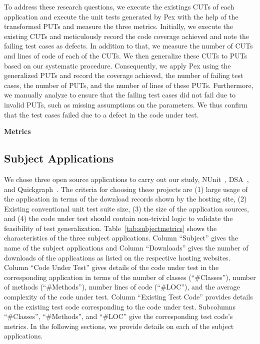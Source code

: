 To address these research questions, we execute the existings CUTs of each application and execute the unit tests generated by Pex with the help of the transformed PUTs and measure the three metrics. Initially, we execute the existing CUTs and meticulously record the code coverage achieved and note the failing test cases as defects. In addition to that, we measure the number of CUTs and lines of code of each of the CUTs. We then generalize these CUTs to PUTs based on our systematic procedure. Consequently, we apply Pex using the generalized PUTs and record the coverage achieved, the number of failing test cases, the number of PUTs, and the number of lines of these PUTs. Furthermore, we manually analyze to ensure that the failing test cases did not fail due to invalid PUTs, such as missing assumptions on the parameters. We thus confirm that the test cases failed due to a defect in the code under test. 

\noindent\textbf{Metrics}

\subsection{Subject Applications}

We chose three open source applications to carry out our study, NUnit~\cite{nunit}, DSA~\cite{dsa}, and Quickgraph~\cite{quickgraph}. The criteria for choosing these projects are (1) large usage of the application in terms of the download records shown by the hosting site, (2) Existing conventional unit test suite size, (3) the size of the application sources, and (4) the code under test should contain non-trivial logic to validate the feasibility of test generalization. Table~\ref{tab:subjectmetrics} shows the characteristics of the three subject applications. Column ``Subject'' gives the name of the subject applications and Column ``Downloads'' gives the number of downloads of the applications as listed on the respective hosting websites. Column ``Code Under Test'' gives details of the code under test in the corresponding application in terms of the number of classes (``\#Classes''), number of methods (``\#Methods''), number lines of code (``\#LOC''), and the average complexity of the code under test. Column ``Existing Test Code'' provides details on the existing test code corresponding to the code under test. Subcolumns ``\#Classes'', ``\#Methods'', and ``\#LOC'' give the corresponding test code's metrics. In the following sections, we provide details on each of the subject applications.

